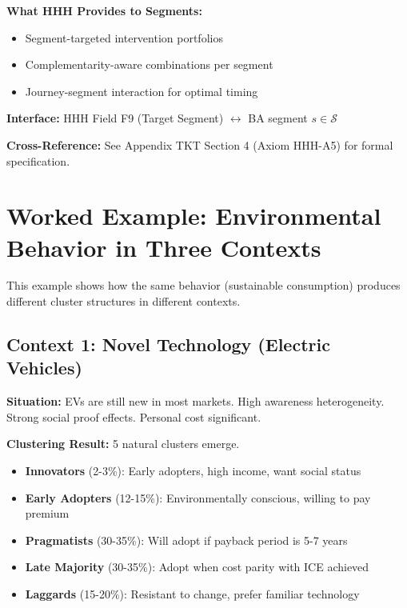 \begin{tcolorbox}[colback=orange!5!white, colframe=orange!75!black,
    title=\textbf{Integration: Segments $\leftrightarrow$ HHH (Intervention Toolkit)}]
\textbf{What HHH Provides to Segments:}
\begin{itemize}[nosep]
\item Segment-targeted intervention portfolios
\item Complementarity-aware combinations per segment
\item Journey-segment interaction for optimal timing
\end{itemize}

\textbf{Interface:} HHH Field F9 (Target Segment) $\leftrightarrow$ BA segment $s \in \mathcal{S}$

\textbf{Cross-Reference:} See Appendix TKT Section 4 (Axiom HHH-A5) for formal specification.

\end{tcolorbox}

\section{Worked Example: Environmental Behavior in Three Contexts}
\label{sec:ba-example}

This example shows how the same behavior (sustainable consumption) produces
different cluster structures in different contexts.

\subsection{Context 1: Novel Technology (Electric Vehicles)}

\textbf{Situation:} EVs are still new in most markets. High awareness heterogeneity.
Strong social proof effects. Personal cost significant.

\textbf{Clustering Result:} 5 natural clusters emerge.

\begin{itemize}[nosep]
\item \textbf{Innovators} (2-3\%): Early adopters, high income, want social status
\item \textbf{Early Adopters} (12-15\%): Environmentally conscious, willing to pay premium
\item \textbf{Pragmatists} (30-35\%): Will adopt if payback period is 5-7 years
\item \textbf{Late Majority} (30-35\%): Adopt when cost parity with ICE achieved
\item \textbf{Laggards} (15-20\%): Resistant to change, prefer familiar technology
\end{itemize}

